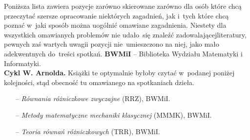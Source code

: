 \documentclass[a4paper,11pt]{article}
\begin{document}
\noindent
Poniższa lista zawiera pozycje zarówno skierowane zarówno dla osób
które chcą przeczytać szersze opracowanie niektórych zagadnień, jak
i~tych które chcą poznać w~jaki sposób można uogólnić omawiane
zagadnienia. Niestety dla wszystkich omawianych problemów nie
udało~się znaleźć zadowalającej\linebreak literatury, pewnych zaś
wartych uwagii pozycji nie~umieszczono na niej, jako mało adekwentnych
do~treści spotkań. \newline
\noindent
\textbf{BWMiI} -- Biblioteka Wydziału Matematyki i Informatyki. \\
\newline
\noindent
\textbf{Cykl W. Arnolda.} Książki te optymalnie byłoby czytać
w~podanej poniżej kolejności, stąd obecność tu omawianego na
spotkaniach dzieła.
\begin{itemize}
\item[--] \emph{Równania różniczkowe zwyczajne} (RRZ), BWMiI.
\item[--] \emph{Metody matematyczne mechaniki klasycznej} (MMMK),
  BWMiI. %
\item[--] \emph{Teoria równań różniczkowych} (TRR), BWMiI.
\end{itemize}
\end{document}
